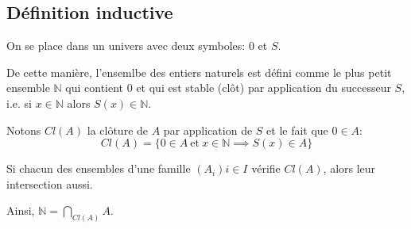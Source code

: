 \subsection{Définition inductive}

On se place dans un univers avec deux symboles: $0$ et $S$.

De cette manière, l'ensemlbe des entiers naturels est défini comme le plus petit ensemble $\mathbb{N}$ qui contient
$0$ et qui est stable (clôt) par application du successeur $S$, i.e. si $x \in \mathbb{N}$ alors $S(x) \in \mathbb{N}$.

Notons $Cl(A)$ la clôture de $A$ par application de $S$ et le fait que $0 \in A$:
$$ Cl(A) = \{ 0 \in A \ \text{et} \ x \in \mathbb{N} \implies S(x) \in A \} $$

\begin{remarque}
    Si chacun des ensembles d'une famille $(A_i){i\in I}$ vérifie $Cl(A)$, alors leur intersection aussi.
\end{remarque}

Ainsi, $\mathbb{N} = \bigcap\limits_{Cl(A)} A$.
